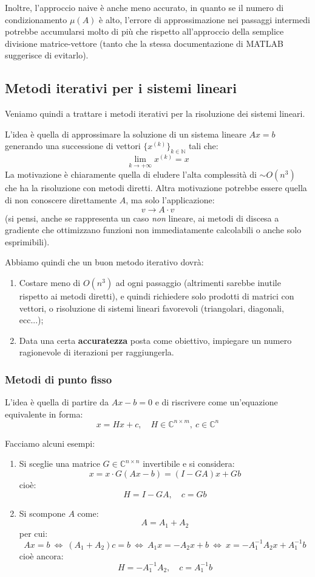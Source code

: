 \documentclass[a4paper,11pt]{article}
\begin{document}
Inoltre, l'approccio naive è anche meno accurato, in quanto se il numero di condizionamento $\mu(A)$ è alto, l'errore di approssimazione nei passaggi intermedi potrebbe accumularsi molto di più che rispetto all'approccio della semplice divisione matrice-vettore (tanto che la stessa documentazione di MATLAB suggerisce di evitarlo).

\subsection{Metodi iterativi per i sistemi lineari}
Veniamo quindi a trattare i metodi iterativi per la risoluzione dei sistemi lineari.

L'idea è quella di approssimare la soluzione di un sistema lineare $Ax = b$ generando una successione di vettori $\{ x^{(k)} \}_{k \in \mathbb{N}}$ tali che:
$$
\lim_{k \rightarrow +\infty} x^{(k)} = x
$$
La motivazione è chiaramente quella di eludere l'alta complessità di $\sim O(n^3)$ che ha la risoluzione con metodi diretti.
Altra motivazione potrebbe essere quella di non conoscere direttamente $A$, ma solo l'applicazione:
$$
v \rightarrow A \cdot v
$$
(si pensi, anche se rappresenta un caso \textit{non} lineare, ai metodi di discesa a gradiente che ottimizzano funzioni non immediatamente calcolabili o anche solo esprimibili).

Abbiamo quindi che un buon metodo iterativo dovrà:
\begin{enumerate}
	\item Costare meno di $O(n^3)$ ad ogni passaggio (altrimenti sarebbe inutile rispetto ai metodi diretti), e quindi richiedere solo prodotti di matrici con vettori, o risoluzione di sistemi lineari favorevoli (triangolari, diagonali, ecc...);
	
	\item Data una certa \textbf{accuratezza} posta come obiettivo, impiegare un numero ragionevole di iterazioni per raggiungerla.
\end{enumerate}

\subsubsection{Metodi di punto fisso}
L'idea è quella di partire da $Ax - b = 0$ e di riscrivere come un'equazione equivalente in forma:
$$
x = Hx + c, \quad H \in \mathbb{C}^{n \times m}, \ c \in \mathbb{C}^n
$$

Facciamo alcuni esempi:
\begin{enumerate}
	\item Si sceglie una matrice $G \in \mathbb{C}^{n \times n}$ invertibile e si considera:
		$$
		x = x \cdot G(Ax - b) = (I - GA) x + Gb
		$$
		cioè:
		$$
		H = I - GA, \quad c = Gb
		$$

	\item Si scompone $A$ come:
		$$
		A = A_1 + A_2
		$$
		per cui:
		$$
		Ax = b \ \Leftrightarrow \ (A_1 + A_2) c = b \ \Leftrightarrow \ A_1 x = - A_2 x + b \ \Leftrightarrow \ x = -A_1^{-1} A_2 x + A_1^{-1} b
		$$
		cioè ancora:
		$$
		H = -A_1^{-1}A_2 , \quad c = A_1^{-1} b
		$$
\end{enumerate}
\end{document}
